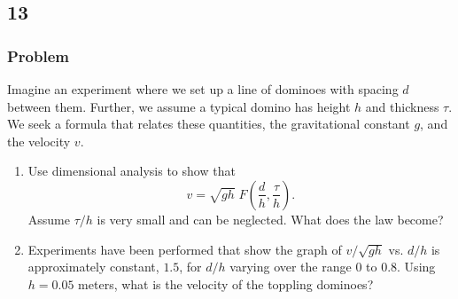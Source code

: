 \documentclass[12pt]{article}
\begin{document}
  \newpage
  \subsection{13}
  \subsubsection*{Problem}
  Imagine an experiment where we set up a line of dominoes with spacing $d$
  between them. Further, we assume a typical domino has height $h$ and thickness
  $\tau$. We seek a formula that relates these quantities, the gravitational
  constant $g$, and the velocity $v$.

  \begin{enumerate}
  \item Use dimensional analysis to show
    that
    \begin{equation}
      \label{eq:13-1-question}
      v=\sqrt{gh}\; F\left(\frac{d}{h},\frac{\tau}{h}\right).
    \end{equation}
    Assume $\tau/h$ is very small and can be neglected. What does the law become?
  \item Experiments have been performed that show the graph of $v/\sqrt{gh}$ vs.
    $d/h$ is approximately constant, $1.5$, for $d/h$ varying over the range $0$
    to $0.8$. Using $h=0.05$ meters, what is the velocity of the toppling dominoes?
  \end{enumerate}
\end{document}
